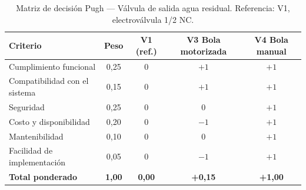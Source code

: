 \begin{table}[H]
\centering
\caption{Matriz de decisión Pugh --- Válvula de salida agua residual. Referencia: V1, electroválvula 1/2\textquotedbl{} NC.}
\label{tab:pugh-valvula-regulacion}
\begin{tabularx}{\textwidth}{Xcccc}
\toprule
\textbf{Criterio} & \textbf{Peso} & \textbf{V1 (ref.)} & \textbf{V3 Bola motorizada} & \textbf{V4 Bola manual} \\
\midrule
Cumplimiento funcional        & 0,25 & 0 & $+1$ & $+1$ \\
Compatibilidad con el sistema & 0,15 & 0 & $+1$ & $+1$ \\
Seguridad                     & 0,25 & 0 & 0    & $+1$ \\
Costo y disponibilidad        & 0,20 & 0 & $-1$ & $+1$ \\
Mantenibilidad                & 0,10 & 0 & 0    & $+1$ \\
Facilidad de implementación   & 0,05 & 0 & $-1$ & $+1$ \\
\midrule
\textbf{Total ponderado}      & \textbf{1,00} & \textbf{0,00} & \textbf{+0,15} & \textbf{+1,00} \\
\bottomrule
\end{tabularx}
\end{table}
